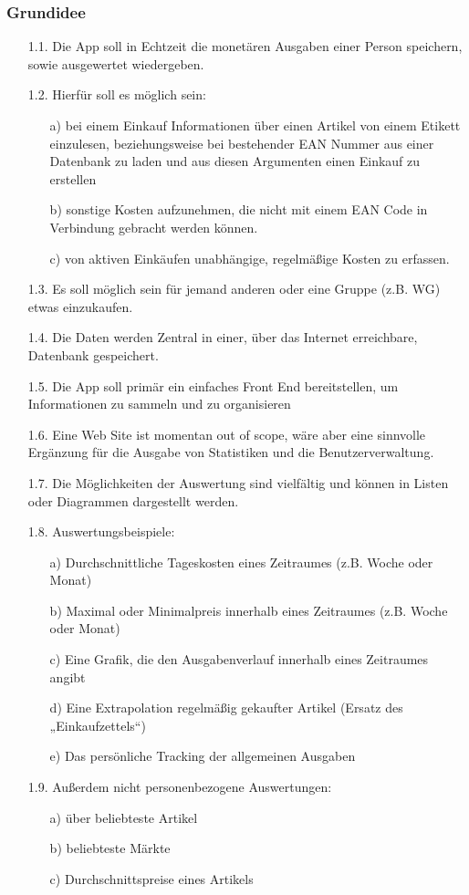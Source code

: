 \documentclass[12pt,a4paper]{article}
\begin{document}
\subsubsection{Grundidee}
\begin{itemize}
 \item[1.1.] Die App soll in Echtzeit die monetären Ausgaben einer Person speichern, sowie ausgewertet wiedergeben.
 \item[1.2.] Hierfür soll es möglich sein:
 \begin{itemize}
 \item[a)] bei einem Einkauf Informationen über einen Artikel von einem Etikett einzulesen, beziehungsweise bei bestehender EAN Nummer aus einer Datenbank zu laden und aus diesen Argumenten einen Einkauf zu erstellen
  \item[b)] sonstige Kosten aufzunehmen, die nicht mit einem EAN Code in Verbindung gebracht werden können.
  \item[c)] von aktiven Einkäufen unabhängige, regelmäßige Kosten zu erfassen.
  \end{itemize}
 \item[1.3.] Es soll möglich sein für jemand anderen oder eine Gruppe (z.B. WG) etwas einzukaufen.
 \item[1.4.] Die Daten werden Zentral in einer, über das Internet erreichbare, Datenbank gespeichert.
 \item[1.5.] Die App soll primär ein einfaches Front End bereitstellen, um Informationen zu sammeln und zu organisieren
 \item[1.6.] Eine Web Site ist momentan out of scope, wäre aber eine sinnvolle Ergänzung für die Ausgabe von Statistiken und die Benutzerverwaltung.
 \item[1.7.] Die Möglichkeiten der Auswertung sind vielfältig und können in Listen oder Diagrammen dargestellt werden.
 \newpage
 \item[1.8.] Auswertungsbeispiele:
 \begin{itemize}
\item[a)]Durchschnittliche Tageskosten eines Zeitraumes (z.B. Woche oder Monat)
 \item[b)] Maximal oder Minimalpreis innerhalb eines Zeitraumes (z.B. Woche oder Monat) 
\item[c)] Eine Grafik, die den Ausgabenverlauf innerhalb eines Zeitraumes angibt
\item[d)] Eine Extrapolation regelmäßig gekaufter Artikel (Ersatz des „Einkaufzettels“)
\item[e)]Das persönliche Tracking der allgemeinen Ausgaben
\end{itemize}
 \item[1.9.] Außerdem nicht personenbezogene Auswertungen:
 \begin{itemize}
\item[a)]über beliebteste Artikel
\item[b)] beliebteste Märkte
\item[c)] Durchschnittspreise eines Artikels
\end{itemize}
\end{itemize}
 
\end{document}
